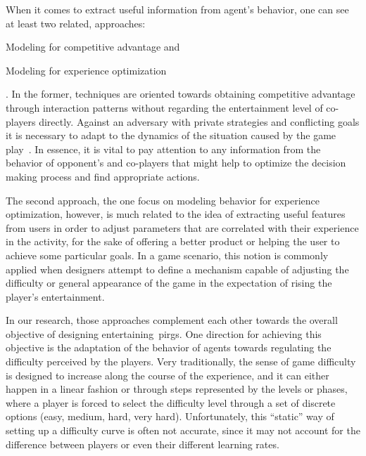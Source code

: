 When it comes to extract useful information from agent's behavior, one can see at least two related, approaches: \begin{inparaenum}\item Modeling for competitive advantage and \item Modeling for experience optimization\end{inparaenum}. In the former, techniques are oriented towards obtaining competitive advantage through interaction patterns without regarding the entertainment level of co-players directly. %
Against an adversary with private strategies and conflicting goals it is necessary to adapt to the dynamics of the situation caused by the game play~\citep{rofer_overview_2012}. In essence, it is vital to pay attention to any information from the behavior of opponent's and co-players that might help to optimize the decision making process and find appropriate actions.

The second approach, \ie the one focus on modeling behavior for experience optimization, however, is much related to the idea of extracting useful features from users in order to adjust parameters that are correlated with their experience in the activity, for the sake of offering a better product or helping the user to achieve some particular goals. In a game scenario, this notion is commonly applied when designers attempt to define a mechanism capable of adjusting the difficulty or general appearance of the game in the expectation of rising the player's entertainment.

In our research, those approaches complement each other towards the overall objective of designing entertaining~\glspl{pirg}. One direction for achieving this objective is the adaptation of the behavior of agents towards regulating the difficulty perceived by the players. Very traditionally, the sense of game difficulty is designed to increase along the course of the experience, and it can either happen in a linear fashion or through steps represented by the levels or phases, where a player is forced to select the difficulty level through a set of discrete options (easy, medium, hard, very hard). Unfortunately, this ``static'' way of setting up a difficulty curve is often not accurate, since it may not account for the difference between players or even their different learning rates. %

